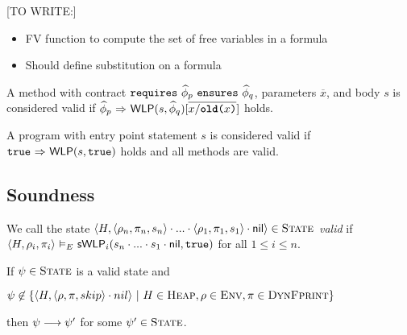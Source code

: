 \documentclass {llncs}
\begin{document}
[TO WRITE:]
\begin{itemize}
\item FV function to compute the set of free variables in a formula
\item Should define substitution on a formula
\end{itemize}

\begin{definition}\label{def:svlrp-valid-method}
   A method with contract $\contract{\sphi_p}{\sphi_q}$, parameters $\overline{x}$, and body $s$ is considered valid if $\phiImplies{\sphi_p}{\WP(s,\sphi_q)[\overline{x/\phiOld{x}}]}$ holds.
\end{definition}

\begin{definition}\label{def:svlrp-valid-prog}
   A program with entry point statement $s$ is considered valid if $\phiImplies{\phiTrue}{\WP(s,\phiTrue)}$ holds and all methods are valid.
\end{definition}

\subsection{Soundness}
%

\begin{definition}\label{def:svlrp-valid-conf-equi}
    We call the state $\langle H, \langle \rho_n, \pi_n, s_n \rangle \cdot ... \cdot \langle \rho_1, \pi_1, s_1 \rangle \cdot \nil \rangle \in \setProgramState$ {\em valid} if $\evalphiGen{E}{\langle H, \rho_i, \pi_i \rangle}{\sWP_i(s_n \cdot ... \cdot s_1 \cdot \nil, \phiTrue)}$ for all $1 \leq i \leq n$.
\end{definition}

\begin{proposition}\label{prop:svlrp-progress-equi}
    If $\psi \in \setProgramState$ is a valid state and 
    
\noindent $\psi \not \in \{\langle H, \langle \rho, \pi, skip \rangle \cdot nil \rangle ~\vert~ H \in \setHeap, \rho \in \setVarEnv, \pi \in \setDFootprintEqui\}$ 

\noindent then $\psi \sstepArrow \psi'$ for some $\psi' \in \setProgramState$. 
\end{proposition}
\end{document}
